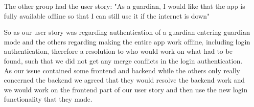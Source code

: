 The other group had the user story: "As a guardian, I would like that the app is fully available offline so that I can still use it if the internet is down"

So as our user story was regarding authentication of a guardian entering guardian mode and the others regarding making the entire app work offline, including login authentication, therefore a resolution to who would work on what had to be found, such that we did not get any merge conflicts in the login authentication. 
As our issue contained some frontend and backend while the others only really concerned the backend we agreed that they would resolve the backend work and we would work on the frontend part of our user story and then use the new login functionality that they made.
